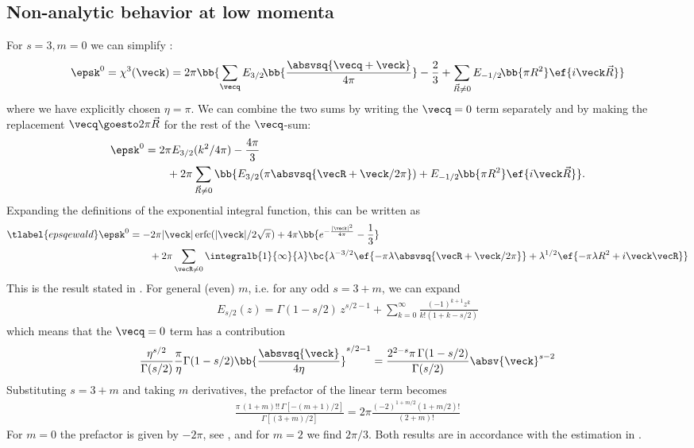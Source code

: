 \subsection{Non-analytic behavior at low momenta}
For $s=3, m=0$ we can simplify :
\begin{align}
    \epsk^0 = \chi^3(\veck) = 2\pi \bb{ \sum_{\vecq} E_{3/2}\!\bb{\frac{\absvsq{\vecq+\veck}}{4\pi}} - \frac{2}{3} + \sum_{\vec{R}\ne 0} E_{-1/2}\!\bb{\pi R^2} \ef{i \veck \vec{R}} }
\end{align}
where we have explicitly chosen $\eta = \pi$. We can combine the two sums by writing the $\vecq=0$ term separately and by making the replacement $\vecq \goesto 2\pi\vec{R}$ for the rest of the $\vecq$-sum:
\begin{align}
    \epsk^0 &= 2\pi  E_{3/2}(k^2/4\pi) - \frac{4\pi}{3}\\
                 &\qquad+ 2\pi\sum_{\vec{R}\ne 0} \bb{ E_{3/2}( \pi \absvsq{\vecR+\veck/2\pi} ) + E_{-1/2}\!\bb{\pi R^2} \ef{i \veck \vec{R}} }.
\end{align}
Expanding the definitions of the exponential integral function, this can be written as
\begin{align} \tlabel{epsqewald}
    \epsk^0 &= -2 \pi  |\veck| \operatorname{erfc}( |\veck|/2 \sqrt{\pi} ) + 4 \pi \bb{ e^{-\frac{|\veck|^2}{4 \pi }}-\frac{1 }{3} } \\
            &\qquad+ 2\pi \sum_{\vecR\ne 0} \integralb{1}{\infty}{\lambda} \bc{ \lambda^{-3/2} \ef{-\pi\lambda\absvsq{\vecR+\veck/2\pi}} + \lambda^{1/2} \ef{-\pi \lambda R^2+ i\veck \vecR} }
\end{align}
This is the result stated in .
For general (even) $m$, i.e. for any odd $s=3+m$, we can expand
\begin{align}
    E_{s/2}(z) = \Gamma(1-s/2)\, z^{s/2-1} + \sum_{k=0}^\infty \frac{(-1)^{k+1} z^k}{k! (1+k-s/2)}
\end{align}
which means that the $\vecq=0$ term has a contribution
\begin{align}
\frac{\eta^{s/2}}{\Gamma(s/2)} \frac{\pi}{\eta} \Gamma(1-s/2) \bb{\frac{\absvsq{\veck}}{4\eta}}^{s/2-1} = \frac{2^{2-s}\pi\, \Gamma(1-s/2)}{\Gamma(s/2)} \absv{\veck}^{s-2}
\end{align}
Substituting $s=3+m$ and taking $m$ derivatives, the prefactor of the linear term becomes
\begin{align}
    \frac{\pi\, (1+m)!! \,\Gamma[-(m+1)/2]}{\Gamma[(3+m)/2]} = 2\pi \frac{(-2)^{1+m/2} (1+m/2)!}{(2+m)!}
\end{align}
For $m=0$ the prefactor is given by $-2\pi$, see , and for $m=2$ we find $2\pi/3$. Both results are in accordance with the estimation in .
